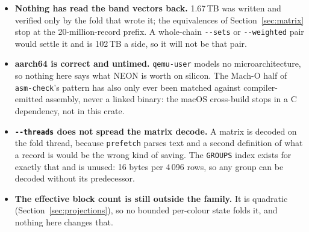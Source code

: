 \documentclass[11pt,a4paper]{article}
\newcommand{\bin}[1]{\texttt{#1}}
\newcommand{\flag}[1]{\texttt{-{}-#1}}
\begin{document}
\begin{itemize}
  \item \textbf{Nothing has read the band vectors back.} 1.67\,TB was written
        and verified only by the fold that wrote it; the equivalences of
        Section~\ref{sec:matrix} stop at the 20-million-record prefix. A
        whole-chain \flag{sets} or \flag{weighted} pair would settle it and is
        102\,TB a side, so it will not be that pair.
  \item \textbf{aarch64 is correct and untimed.} \texttt{qemu-user} models no
        microarchitecture, so nothing here says what NEON is worth on silicon.
        The Mach-O half of \texttt{asm-check}'s pattern has also only ever been
        matched against compiler-emitted assembly, never a linked binary: the
        macOS cross-build stops in a C dependency, not in this crate.
  \item \textbf{\flag{threads} does not spread the matrix decode.} A matrix is
        decoded on the fold thread, because \bin{prefetch} parses text and a
        second definition of what a record is would be the wrong kind of saving.
        The \texttt{GROUPS} index exists for exactly that and is unused: 16 bytes
        per 4\,096 rows, so any group can be decoded without its predecessor.
  \item \textbf{The effective block count is still outside the family.} It is
        quadratic (Section~\ref{sec:projections}), so no bounded per-colour state
        folds it, and nothing here changes that.
\end{itemize}
\end{document}
